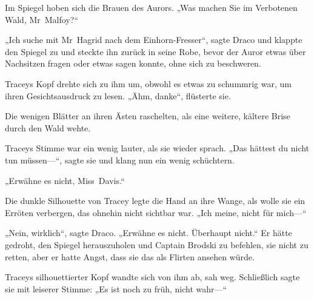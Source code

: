 Im Spiegel hoben sich die Brauen des Aurors. „Was machen Sie im Verbotenen Wald, Mr~Malfoy?“

„Ich suche mit Mr~Hagrid nach dem Einhorn-Fresser“, sagte Draco und klappte den Spiegel zu und steckte ihn zurück in seine Robe, bevor der Auror etwas über Nachsitzen fragen oder etwas sagen konnte, ohne sich zu beschweren.

Traceys Kopf drehte sich zu ihm um, obwohl es etwas zu schummrig war, um ihren Gesichtsausdruck zu lesen. „Ähm, danke“, flüsterte sie.

Die wenigen Blätter an ihren Ästen raschelten, als eine weitere, kältere Brise durch den Wald wehte.

Traceys Stimme war ein wenig lauter, als sie wieder sprach. „Das hättest du nicht tun müssen—“, sagte sie und klang nun ein wenig schüchtern.

„Erwähne es nicht, Miss~Davis.“

Die dunkle Silhouette von Tracey legte die Hand an ihre Wange, als wolle sie ein Erröten verbergen, das ohnehin nicht sichtbar war. „Ich meine, nicht für mich—“

„Nein, wirklich“, sagte Draco. „Erwähne es nicht. Überhaupt nicht.“
Er hätte gedroht, den Spiegel herauszuholen und Captain Brodski zu befehlen, sie nicht zu retten, aber er hatte Angst, dass sie das als Flirten ansehen würde.

Traceys silhouettierter Kopf wandte sich von ihm ab, sah weg. Schließlich sagte sie mit leiserer Stimme: „Es ist noch zu früh, nicht wahr—“


